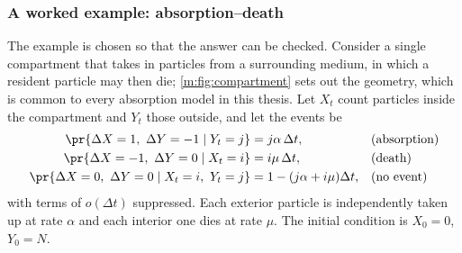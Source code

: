 \subsubsection{A worked example: absorption--death}
\label{m:sec:mocworked}

The example is chosen so that the answer can be checked. Consider a single
compartment that takes in particles from a surrounding medium, in which a resident
particle may then die; \cref{m:fig:compartment} sets out the geometry, which is
common to every absorption model in this thesis. Let $X_t$ count particles inside
the compartment and $Y_t$ those outside, and let the events be
\begin{align*}
\pr{\Delta X=1,\ \Delta Y=-1\mid Y_t=j} &= j\alpha\,\Delta t, &&\text{(absorption)}\\
\pr{\Delta X=-1,\ \Delta Y=0\mid X_t=i} &= i\mu\,\Delta t, &&\text{(death)}\\
\pr{\Delta X=0,\ \Delta Y=0\mid X_t=i,\ Y_t=j} &= 1-(j\alpha+i\mu)\Delta t, &&\text{(no event)}
\end{align*}
with terms of $o(\Delta t)$ suppressed. Each exterior particle is independently
taken up at rate $\alpha$ and each interior one dies at rate $\mu$. The initial
condition is $X_0=0$, $Y_0=N$.

